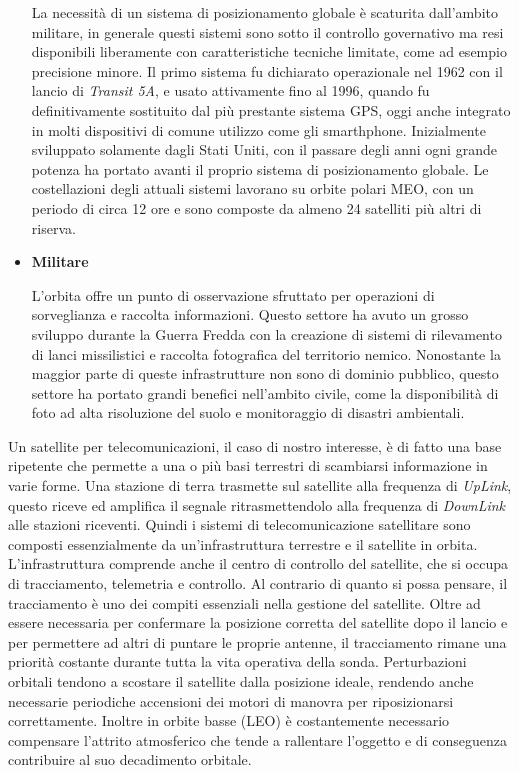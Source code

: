 \documentclass[12pt,a4paper,oneside]{book}
\begin{document}
\begin{itemize}
				La necessità di un sistema di posizionamento globale è scaturita dall'ambito militare, in generale questi sistemi sono sotto il controllo governativo ma resi disponibili liberamente con caratteristiche tecniche limitate, come ad esempio precisione minore. Il primo sistema fu dichiarato operazionale nel 1962 con il lancio di {\it Transit 5A}, e usato attivamente fino al 1996, quando fu definitivamente sostituito dal più prestante sistema GPS, oggi anche integrato in molti dispositivi di comune utilizzo come gli smarthphone. Inizialmente sviluppato solamente dagli Stati Uniti, con il passare degli anni ogni grande potenza ha portato avanti il proprio sistema di posizionamento globale. Le costellazioni degli attuali sistemi lavorano su orbite polari MEO, con un periodo di circa 12 ore e sono composte da almeno 24 satelliti più altri di riserva. 
				
				\item {\bf Militare}
				
				L'orbita offre un punto di osservazione sfruttato per operazioni di sorveglianza e raccolta informazioni. Questo settore ha avuto un grosso sviluppo durante la Guerra Fredda con la creazione di sistemi di rilevamento di lanci missilistici e raccolta fotografica del territorio nemico. Nonostante la maggior parte di queste infrastrutture non sono di dominio pubblico, questo settore ha portato grandi benefici nell'ambito civile, come la disponibilità di foto ad alta risoluzione del suolo e monitoraggio di disastri ambientali.
				
			\end{itemize}
			Un satellite per telecomunicazioni, il caso di nostro interesse, è di fatto una base ripetente che permette a una o più basi terrestri di scambiarsi informazione in varie forme. Una stazione di terra trasmette sul satellite alla frequenza di {\it UpLink}, questo riceve ed amplifica il segnale ritrasmettendolo alla frequenza di {\it DownLink} alle stazioni riceventi. Quindi i sistemi di telecomunicazione satellitare sono composti essenzialmente da un'infrastruttura terrestre e il satellite in orbita. L'infrastruttura comprende anche il centro di controllo del satellite, che si occupa di tracciamento, telemetria e controllo. Al contrario di quanto si possa pensare, il tracciamento è uno dei compiti essenziali nella gestione del satellite. Oltre ad essere necessaria per confermare la posizione corretta del satellite dopo il lancio e per permettere ad altri di puntare le proprie antenne, il tracciamento rimane una priorità costante durante tutta la vita operativa della sonda. Perturbazioni orbitali tendono a scostare il satellite dalla posizione ideale, rendendo anche necessarie periodiche accensioni dei motori di manovra per riposizionarsi correttamente. Inoltre in orbite basse (LEO) è costantemente necessario compensare l'attrito atmosferico che tende a rallentare l'oggetto e di conseguenza contribuire al suo decadimento orbitale. 
\end{document}
